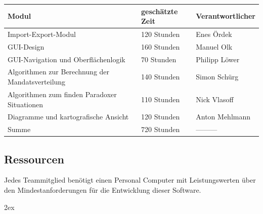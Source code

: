 \documentclass[10pt,a4paper]{article}
\begin{document}
\begin{tabular}[h]{lll}
	\hline
	\textbf{Modul} & \textbf{geschätzte Zeit} & \textbf{Verantwortlicher} \\
	\hline
	Import-Export-Modul & 120 Stunden & Enes Ördek\\
	GUI-Design & 160 Stunden & Manuel Olk \\
	GUI-Navigation und Oberflächenlogik & 70 Stunden &  Philipp Löwer\\
	Algorithmen zur Berechnung der Mandatsverteilung & 140 Stunden &  Simon Schürg\\
	Algorithmen zum finden Paradoxer Situationen  & 110 Stunden &  Nick Vlasoff\\
	Diagramme und kartografische Ansicht  & 120 Stunden &  Anton Mehlmann\\
	\hline
	Summe & 720 Stunden & --------- \\
	\hline
\end{tabular}


\subsection{Ressourcen}
Jedes Teammitglied benötigt einen Personal Computer mit Leistungswerten über den Mindestanforderungen für die Entwicklung dieser Software.
\newpage
\renewcommand{\notesname}{15 Glossar}


\begingroup
\parindent 0pt
\parskip 2ex
\def\enotesize{\normalsize}
\theendnotes
\endgroup
\end{document}
